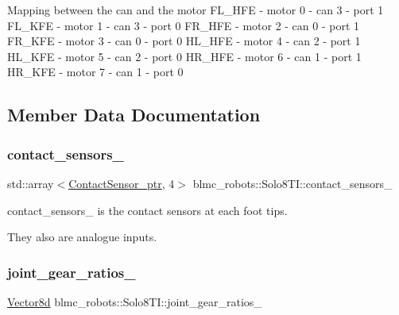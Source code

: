 Mapping between the can and the motor F\+L\+\_\+\+H\+FE -\/ motor 0 -\/ can 3 -\/ port 1 F\+L\+\_\+\+K\+FE -\/ motor 1 -\/ can 3 -\/ port 0 F\+R\+\_\+\+H\+FE -\/ motor 2 -\/ can 0 -\/ port 1 F\+R\+\_\+\+K\+FE -\/ motor 3 -\/ can 0 -\/ port 0 H\+L\+\_\+\+H\+FE -\/ motor 4 -\/ can 2 -\/ port 1 H\+L\+\_\+\+K\+FE -\/ motor 5 -\/ can 2 -\/ port 0 H\+R\+\_\+\+H\+FE -\/ motor 6 -\/ can 1 -\/ port 1 H\+R\+\_\+\+K\+FE -\/ motor 7 -\/ can 1 -\/ port 0

\subsection{Member Data Documentation}
\mbox{\label{classblmc__robots_1_1Solo8TI_afc6e87d1cec24fd373345e41df874baf}} 
\subsubsection{\texorpdfstring{contact\+\_\+sensors\+\_\+}{contact\_sensors\_}}
{\footnotesize\ttfamily std\+::array$<$\hyperlink{common__header_8hpp_ac78fe5c68e56a3b884117109959e4d58}{Contact\+Sensor\+\_\+ptr}, 4$>$ blmc\+\_\+robots\+::\+Solo8\+T\+I\+::contact\+\_\+sensors\+\_\+\hspace{0.3cm}{\ttfamily [private]}}



contact\+\_\+sensors\+\_\+ is the contact sensors at each foot tips. 

They also are analogue inputs. \mbox{\label{classblmc__robots_1_1Solo8TI_a670ec9c986127612259d66e4f33d20b3}} 
\subsubsection{\texorpdfstring{joint\+\_\+gear\+\_\+ratios\+\_\+}{joint\_gear\_ratios\_}}
{\footnotesize\ttfamily \hyperlink{common__header_8hpp_a98975ffbe0bca1296078e0350dfedd60}{Vector8d} blmc\+\_\+robots\+::\+Solo8\+T\+I\+::joint\+\_\+gear\+\_\+ratios\+\_\+\hspace{0.3cm}{\ttfamily [private]}}



